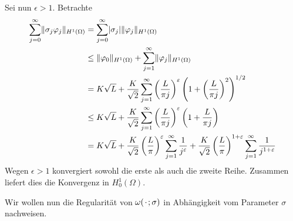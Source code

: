 \begin{Lemma}
\begin{Beweis}
        Sei nun $\epsilon > 1$.
        Betrachte
        \begin{align}
            \sum_{j = 0}^{\infty} \lVert\sigma_{j} \varphi_{j}\rVert_{H^{1}(\Omega)}
            &= \sum_{j = 0}^{\infty} \lvert\sigma_{j}\rvert \lVert\varphi_{j}\rVert_{H^{1}(\Omega)}
            \\&\leq  \lVert\varphi_{0}\rVert_{H^{1}(\Omega)} + \sum_{j = 1}^{\infty} \lVert\varphi_{j}\rVert_{H^{1}(\Omega)}
            \\&= K \sqrt{L} +
            \frac{K}{\sqrt{2}} \sum_{j = 1}^{\infty} \left( \frac{L}{\pi j} \right)^{\varepsilon} \left( 1 + \left( \frac{L}{\pi j} \right)^{2} \right)^{1 / 2}
            \\&\leq K \sqrt{L} +
            \frac{K}{\sqrt{2}} \sum_{j = 1}^{\infty} \left( \frac{L}{\pi j} \right)^{\varepsilon} \left( 1 + \frac{L}{\pi j} \right)
            \\&= K \sqrt{L} +
            \frac{K}{\sqrt{2}} \left( \frac{L}{\pi}  \right)^{\varepsilon} \sum_{j = 1}^{\infty} \frac{1}{j^{\varepsilon}} + \frac{K}{\sqrt{2}} \left( \frac{L}{\pi}  \right)^{1 + \varepsilon} \sum_{j = 1}^{\infty} \frac{1}{j^{1+\varepsilon}}
        \end{align}
        Wegen $\epsilon > 1$ konvergiert sowohl die erste als auch die zweite Reihe.
        Zusammen liefert dies die Konvergenz in $H^{1}_{0}(\Omega)$.
    \end{Beweis}
\end{Lemma}

Wir wollen nun die Regularität von $\omega({\mkern2mu\cdot\mkern2mu}; \sigma)$ in Abhängigkeit vom Parameter $\sigma$ nachweisen.

